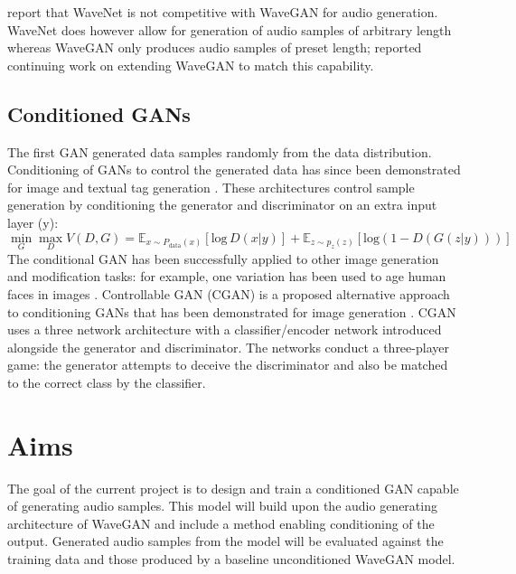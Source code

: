 \documentclass[a4paper, dvipsnames, titlepage]{article}
\begin{document}
\newline
\newline
\citeauthor{2018arXiv180204208D} report that WaveNet is not competitive with WaveGAN for audio generation.
WaveNet does however allow for generation of audio samples of arbitrary length whereas WaveGAN only produces audio samples of preset length; \citeauthor{2018arXiv180204208D} reported continuing work on extending WaveGAN to match this capability.

\subsection{Conditioned GANs}

The first GAN generated data samples randomly from the data distribution.
Conditioning of GANs to control the generated data has since been demonstrated for image and textual tag generation \citep{2014arXiv1411.1784M}.
These architectures control sample generation by conditioning the generator and discriminator on an extra input layer (y):
\newline
%
\begin{equation}
  \min_{G} \max_{D} V(D,G) = \mathbb{E}_{x \sim P_\mathrm{data}(x)}[\mathrm{log}\,D(x|y)] + \mathbb{E}_{z \sim p_z(z)}[\mathrm{log} (1 - D(G(z|y)))]
\end{equation}
%
\newline
The conditional GAN has been successfully applied to other image generation and modification tasks: for example, one variation has been used to age human faces in images \citep{2017arXiv170201983A}.
\newline
\newline
Controllable GAN (CGAN) is a proposed alternative approach to conditioning GANs that has been demonstrated for image generation \citep{2017arXiv170800598L}.
CGAN uses a three network architecture with a classifier/encoder network introduced alongside the generator and discriminator.
The networks conduct a three-player game: the generator attempts to deceive the discriminator and also be matched to the correct class by the classifier.

\newpage

\section{Aims}

The goal of the current project is to design and train a conditioned GAN capable of generating audio samples.
This model will build upon the audio generating architecture of WaveGAN and include a method enabling conditioning of the output.
Generated audio samples from the model will be evaluated against the training data and those produced by a baseline unconditioned WaveGAN model.
\end{document}
